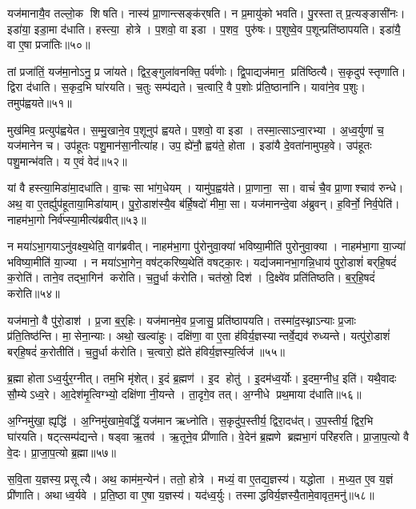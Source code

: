 यज॑मानायै॒व तल्लो॒क शिषति।
नास्य॑ प्रा॒णान्त्सङ्क॑र्‌षति।
न प्र॒मायु॑को भवति।
पु॒रस्तात् प्र॒त्यङ्ङासी॑नः।
इडा॑या॒ इडा॒मा द॑धाति।
हस्त्या॒ होत्रे।
प॒शवो॒ वा इडा।
प॒शव॒ पुरु॑षः।
प॒शुष्वे॒व प॒शून्प्रति॑ष्ठापयति।
इडा॑यै॒ वा ए॒षा प्रजा॑तिः॥५०॥

तां प्रजा॑तिं॒ यज॑मा॒नोऽनु॒ प्र जा॑यते।
द्विर॒ङ्गुला॑वनक्ति॒ पर्व॑णोः।
द्वि॒पाद्यज॑मान॒ प्रति॑ष्ठित्यै।
स॒कृदुप॑ स्तृणाति।
द्विरा द॑धाति।
स॒कृद॒भि घा॑रयति।
च॒तुः सम्प॑द्यते।
च॒त्वारि॒ वै प॒शोः प्र॑ति॒ष्ठाना॑नि।
यावा॑ने॒व प॒शुः।
तमुप॑ह्वयते॥५१॥

मुख॑मिव॒ प्रत्युप॑ह्वयेत।
स॒म्मु॒खाने॒व प॒शूनुप॑ ह्वयते।
प॒शवो॒ वा इडा।
तस्मा॒त्साऽन्वा॒रभ्या।
अ॒ध्व॒र्युणा॑ च॒ यज॑मानेन च।
उप॑हूतः पशु॒मान॑सा॒नीत्या॑ह।
उप॒ ह्ये॑नौ॒ ह्वय॑ते॒ होता।
इडा॑यै दे॒वता॑नामुपह॒वे।
उप॑हूतः पशु॒मान्भ॑वति।
य ए॒वं वेद॑॥५२॥

यां वै हस्त्या॒मिडा॑मा॒दधा॑ति।
वा॒चः सा भा॑ग॒धेयम्।
यामु॑प॒ह्वय॑ते।
प्रा॒णाना॒ सा।
वाचं॑ चै॒व प्रा॒णाश्चाव॑ रुन्धे।
अथ॒ वा ए॒तर्ह्युप॑हूताया॒मिडा॑याम्।
पु॒रो॒डाश॑स्यै॒व ब॑र्हि॒षदो॑ मीमा॒सा।
यज॑मानन्दे॒वा अ॑ब्रुवन्।
ह॒विर्नो॒ निर्व॒पेति॑।
नाहम॑भा॒गो निर्व॑प्स्या॒मीत्य॑ब्रवीत्॥५३॥

न मया॑ऽभा॒गयाऽनु॑वक्ष्य॒थेति॒ वाग॑ब्रवीत्।
नाहम॑भा॒गा पु॑रोनुवा॒क्या॑ भविष्या॒मीति॑ पुरोनुवा॒क्या।
नाहम॑भा॒गा या॒ज्या॑ भविष्या॒मीति॑ या॒ज्या।
न मया॑ऽभा॒गेन॒ वष॑ट्करिष्य॒थेति॑ वषट्का॒रः।
यद्य॑जमानभा॒गन्नि॒धाय॑ पुरो॒डाशं॑ बर्‌हि॒षदं॑ क॒रोति॑।
ताने॒व तद्भा॒गिन॑ करोति।
च॒तु॒र्धा क॑रोति।
चत॑स्रो॒ दिश॑।
दि॒क्ष्वे॑व प्रति॑तिष्ठति।
ब॒र्॒हि॒षदं॑ करोति॥५४॥

यज॑मानो॒ वै पु॑रो॒डाश॑।
प्र॒जा ब॒र्॒हिः।
यज॑मानमे॒व प्र॒जासु॒ प्रति॑ष्ठापयति।
तस्मा॑द॒स्थ्नाऽन्याः प्र॒जाः प्र॑ति॒तिष्ठ॑न्ति।
मा॒सेना॒न्याः।
अथो॒ खल्वा॑हुः।
दक्षि॑णा॒ वा ए॒ता ह॑विर्य॒ज्ञस्यान्तर्वे॒द्यव॑ रुध्यन्ते।
यत्पु॑रो॒डाशं॑ बर्‌हि॒षदं॑ क॒रोतीति॑।
च॒तु॒र्धा क॑रोति।
च॒त्वारो॒ ह्ये॑ते ह॑विर्य॒ज्ञस्य॒र्त्विज॑॥५५॥

ब्र॒ह्मा होताऽध्व॒र्युर॒ग्नीत्।
तम॒भि मृ॑शेत्।
इ॒दं ब्र॒ह्मण॑।
इ॒द होतु॑।
इ॒दम॑ध्व॒र्योः।
इ॒दम॒ग्नीध॒ इति॑।
यथै॒वादः सौ॒म्येऽध्व॒रे।
आ॒देश॑मृ॒त्विग्भ्यो॒ दक्षि॑णा नी॒यन्ते।
ता॒दृगे॒व तत्।
अ॒ग्नीधे प्रथ॒माया द॑धाति॥५६॥

अ॒ग्निमु॑खा॒ ह्यृद्धि॑।
अ॒ग्निमु॑खामे॒वर्द्धिं॒ यज॑मान ऋध्नोति।
स॒कृदु॑प॒स्तीर्य॒ द्विरा॒दध॑त्।
उ॒प॒स्तीर्य॒ द्विर॒भि घा॑रयति।
षट्त्सम्प॑द्यन्ते।
षड्वा ऋ॒तव॑।
ऋ॒तूने॒व प्री॑णाति।
वे॒देन॑ ब्र॒ह्मणे ब्रह्मभा॒गं परि॑हरति।
प्रा॒जा॒प॒त्यो वै वे॒दः।
प्रा॒जा॒प॒त्यो ब्र॒ह्मा॥५७॥

स॒वि॒ता य॒ज्ञस्य॒ प्रसूत्यै।
अथ॒ काम॑म॒न्येन॑।
ततो॒ होत्रे।
मध्यं॒ वा ए॒तद्य॒ज्ञस्य॑।
यद्धोता।
म॒ध्य॒त ए॒व य॒ज्ञं प्री॑णाति।
अथाध्व॒र्यवे।
प्र॒ति॒ष्ठा वा ए॒षा य॒ज्ञस्य॑।
यद॑ध्व॒र्युः।
तस्माद्धविर्य॒ज्ञस्यै॒तामे॒वावृत॒मनु॑॥५८॥

